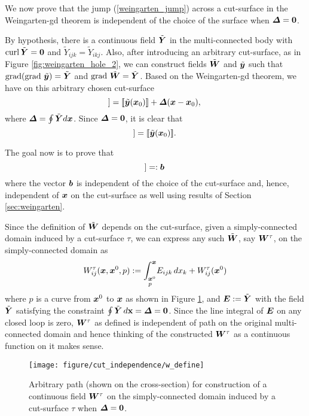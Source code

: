 \documentclass[11pt,letterpaper]{article}
\begin{document}
We now prove that the jump (\ref{weingarten_jump}) across a cut-surface in the Weingarten-gd theorem is independent of the choice of the surface when $\bfDelta = \bf0$. 

By hypothesis, there is a continuous field $\tilde{\bfY}$ in the multi-connected body with $\curl \tilde{\bfY} = \bf0$ and $\tilde{Y}_{ijk} = \tilde{Y}_{ikj}$. Also, after introducing an arbitrary cut-surface, as in Figure \ref{fig:weingarten_hole_2}, we can construct fields $\tilde{\bfW}$ and $\tilde{\bfy}$ such that $\grad (\grad \,\tilde{\bfy}) = \tilde{\bfY}$ and $\grad \,\tilde{\bfW} = \tilde{\bfY}$. Based on the Weingarten-gd theorem, we have on this arbitrary chosen cut-surface
\begin{equation*}
[\![\tilde{\bfy}(\bfx)]\!] = [\![\tilde{\bfy}(\bfx_0)]\!] + \bfDelta (\bfx-\bfx_0),
\end{equation*}
where $\bfDelta = \oint \tilde{\bfY} d\bfx$. Since $\bfDelta = \bf0$, it is clear that
\begin{equation*}
[\![\tilde{\bfy}(\bfx)]\!] = [\![\tilde{\bfy}(\bfx_0)]\!].
\end{equation*}

The goal now is to prove that 
\begin{equation*}
[\![\tilde{\bfy}(\bfx)]\!] =:\bfb
\end{equation*}
where the vector $\bfb$ is independent of the choice of the cut-surface and, hence, independent of $\bfx$ on the cut-surface as well using results of Section \ref{sec:weingarten}.

Since the definition of $\tilde{\bfW}$ depends on the cut-surface, given a simply-connected domain induced by a cut-surface $\tau$, we can express any such $\tilde{\bfW}$, say  $\bfW^\tau$, on the simply-connected domain as
\begin{equation}\label{eqn:w_definition}
W^\tau_{ij}(\bfx,\bfx^0,p) := \underset{p}{\int_{\bfx^0}^{\bfx}} E_{ijk} \, dx_k + W^\tau_{ij}(\bfx^0)
\end{equation}
where $p$ is a curve from $\bfx^0$ to $\bfx$ as shown in Figure \ref{fig:cut_proof_3}, and $\bfE := \tilde{\bfY}$ with the field $\tilde{\bfY}$ satisfying the constraint $\oint \tilde{\bfY} \, d\bf{x} = \bfDelta = \bf0$. Since the line integral of $\bfE$ on any closed loop is zero, $\bfW^\tau$ as defined is independent of path on the original multi-connected domain and hence thinking of the constructed $\bfW^\tau$ as a continuous function on it makes sense.

\begin{figure}
\centering
\texttt{[image: figure/cut\_independence/w\_define]}
\caption{Arbitrary path (shown on the cross-section) for construction of a continuous field $\bfW^\tau$ on the simply-connected domain induced by a cut-surface $\tau$  when $\bfDelta = \bf0$.}
\label{fig:cut_proof_3}
\end{figure}
\end{document}
